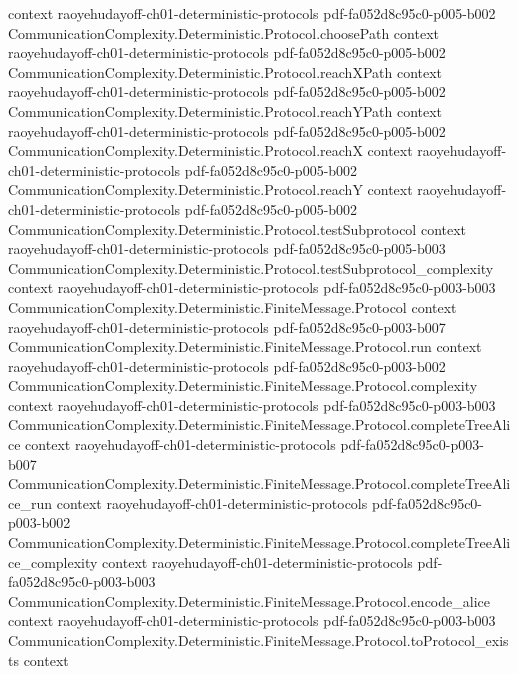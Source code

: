 \begin{theorem}
  {context}
  {raoyehudayoff-ch01-deterministic-protocols}
  {pdf-fa052d8c95c0-p005-b002}
\proofstep
  {CommunicationComplexity.Deterministic.Protocol.choosePath}
  {context}
  {raoyehudayoff-ch01-deterministic-protocols}
  {pdf-fa052d8c95c0-p005-b002}
\proofstep
  {CommunicationComplexity.Deterministic.Protocol.reachXPath}
  {context}
  {raoyehudayoff-ch01-deterministic-protocols}
  {pdf-fa052d8c95c0-p005-b002}
\proofstep
  {CommunicationComplexity.Deterministic.Protocol.reachYPath}
  {context}
  {raoyehudayoff-ch01-deterministic-protocols}
  {pdf-fa052d8c95c0-p005-b002}
\proofstep
  {CommunicationComplexity.Deterministic.Protocol.reachX}
  {context}
  {raoyehudayoff-ch01-deterministic-protocols}
  {pdf-fa052d8c95c0-p005-b002}
\proofstep
  {CommunicationComplexity.Deterministic.Protocol.reachY}
  {context}
  {raoyehudayoff-ch01-deterministic-protocols}
  {pdf-fa052d8c95c0-p005-b002}
\proofstep
  {CommunicationComplexity.Deterministic.Protocol.testSubprotocol}
  {context}
  {raoyehudayoff-ch01-deterministic-protocols}
  {pdf-fa052d8c95c0-p005-b003}
\proofstep
  {CommunicationComplexity.Deterministic.Protocol.testSubprotocol_complexity}
  {context}
  {raoyehudayoff-ch01-deterministic-protocols}
  {pdf-fa052d8c95c0-p003-b003}
\proofstep
  {CommunicationComplexity.Deterministic.FiniteMessage.Protocol}
  {context}
  {raoyehudayoff-ch01-deterministic-protocols}
  {pdf-fa052d8c95c0-p003-b007}
\proofstep
  {CommunicationComplexity.Deterministic.FiniteMessage.Protocol.run}
  {context}
  {raoyehudayoff-ch01-deterministic-protocols}
  {pdf-fa052d8c95c0-p003-b002}
\proofstep
  {CommunicationComplexity.Deterministic.FiniteMessage.Protocol.complexity}
  {context}
  {raoyehudayoff-ch01-deterministic-protocols}
  {pdf-fa052d8c95c0-p003-b003}
\proofstep
  {CommunicationComplexity.Deterministic.FiniteMessage.Protocol.completeTreeAlice}
  {context}
  {raoyehudayoff-ch01-deterministic-protocols}
  {pdf-fa052d8c95c0-p003-b007}
\proofstep
  {CommunicationComplexity.Deterministic.FiniteMessage.Protocol.completeTreeAlice_run}
  {context}
  {raoyehudayoff-ch01-deterministic-protocols}
  {pdf-fa052d8c95c0-p003-b002}
\proofstep
  {CommunicationComplexity.Deterministic.FiniteMessage.Protocol.completeTreeAlice_complexity}
  {context}
  {raoyehudayoff-ch01-deterministic-protocols}
  {pdf-fa052d8c95c0-p003-b003}
\proofstep
  {CommunicationComplexity.Deterministic.FiniteMessage.Protocol.encode_alice}
  {context}
  {raoyehudayoff-ch01-deterministic-protocols}
  {pdf-fa052d8c95c0-p003-b003}
\proofstep
  {CommunicationComplexity.Deterministic.FiniteMessage.Protocol.toProtocol_exists}
  {context}

\end{theorem}
